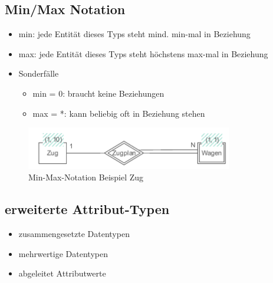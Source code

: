\documentclass[a4paper]{article}
\begin{document}
\subsection{Min/Max Notation}
\begin{itemize}
    \item min: jede Entität dieses Typs steht mind. min-mal in Beziehung
    \item max: jede Entität dieses Typs steht höchstens max-mal in Beziehung
    \item Sonderfälle
    \begin{itemize}
        \item min = 0: braucht keine Beziehungen
        \item max = *: kann beliebig oft in Beziehung stehen
    \end{itemize}
\end{itemize}

\begin{figure}[htp]
    \centering
    \includegraphics[width=9cm]{images/MinMaxNotation.png}
    \caption{Min-Max-Notation Beispiel Zug}
    \label{fig:MinMaxNotation}
\end{figure}

\subsection{erweiterte Attribut-Typen}
\begin{itemize}
    \item zusammengesetzte Datentypen
    \item mehrwertige Datentypen
    \item abgeleitet Attributwerte
\end{itemize}
\end{document}
